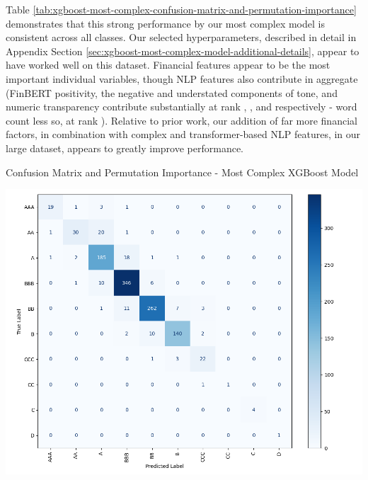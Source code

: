 \documentclass{article}[11pt]
\begin{document}
    Table \ref{tab:xgboost-most-complex-confusion-matrix-and-permutation-importance} demonstrates that this strong performance by our most complex model is consistent across all classes. Our selected hyperparameters, described in detail in Appendix Section \ref{sec:xgboost-most-complex-model-additional-details}, appear to have worked well on this dataset. Financial features appear to be the most important individual variables, though NLP features also contribute in aggregate (FinBERT positivity, the negative and understated components of tone, and numeric transparency contribute substantially at rank \rPosScoreFinbert, \rNeg, and \rUndrst \space respectively - word count less so, at rank \rWordCount). Relative to prior work, our addition of far more financial factors, in combination with complex and transformer-based NLP features, in our large dataset, appears to greatly improve performance.

    \begin{table}[h!]
        \centering
        \caption{Confusion Matrix and Permutation Importance - Most Complex XGBoost Model}
        \begin{minipage}[c]{0.45\linewidth}
            \centering
            \includegraphics[width=0.95\hsize]{../Output/Modelling/XGBoost/exclude_previous_rating_model_3/exclude_previous_rating_model_3_confusion_matrix_no_title.png}
        \end{minipage}
        \begin{minipage}[c]{0.45\linewidth}
            \centering
            
        \end{minipage}
        \label{tab:xgboost-most-complex-confusion-matrix-and-permutation-importance}
    \end{table}
\end{document}
